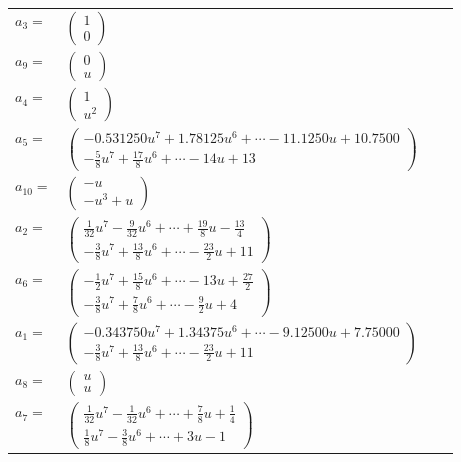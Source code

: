 \documentclass[1p]{elsarticle_modified}
\theoremstyle{definition}
\begin{document}
\begin{tabular}{m{7pt} m{180pt} m{7pt} m{180pt} }
\flushright $a_{3}=$&$\begin{pmatrix}1\\0\end{pmatrix}$ \\
\flushright $a_{9}=$&$\begin{pmatrix}0\\u\end{pmatrix}$ \\
\flushright $a_{4}=$&$\begin{pmatrix}1\\u^2\end{pmatrix}$ \\
\flushright $a_{5}=$&$\begin{pmatrix}-0.531250 u^{7}+1.78125 u^{6}+\cdots-11.1250 u+10.7500\\-\frac{5}{8} u^7+\frac{17}{8} u^6+\cdots-14 u+13\end{pmatrix}$ \\
\flushright $a_{10}=$&$\begin{pmatrix}- u\\- u^3+u\end{pmatrix}$ \\
\flushright $a_{2}=$&$\begin{pmatrix}\frac{1}{32} u^7-\frac{9}{32} u^6+\cdots+\frac{19}{8} u-\frac{13}{4}\\-\frac{3}{8} u^7+\frac{13}{8} u^6+\cdots-\frac{23}{2} u+11\end{pmatrix}$ \\
\flushright $a_{6}=$&$\begin{pmatrix}-\frac{1}{2} u^7+\frac{15}{8} u^6+\cdots-13 u+\frac{27}{2}\\-\frac{3}{8} u^7+\frac{7}{8} u^6+\cdots-\frac{9}{2} u+4\end{pmatrix}$ \\
\flushright $a_{1}=$&$\begin{pmatrix}-0.343750 u^{7}+1.34375 u^{6}+\cdots-9.12500 u+7.75000\\-\frac{3}{8} u^7+\frac{13}{8} u^6+\cdots-\frac{23}{2} u+11\end{pmatrix}$ \\
\flushright $a_{8}=$&$\begin{pmatrix}u\\u\end{pmatrix}$ \\
\flushright $a_{7}=$&$\begin{pmatrix}\frac{1}{32} u^7-\frac{1}{32} u^6+\cdots+\frac{7}{8} u+\frac{1}{4}\\\frac{1}{8} u^7-\frac{3}{8} u^6+\cdots+3 u-1\end{pmatrix}$ \\

\end{tabular}
\end{document}
